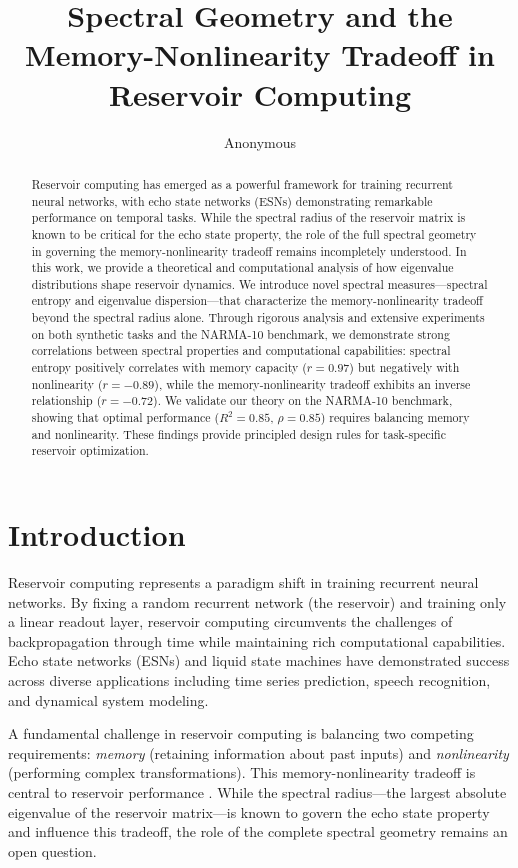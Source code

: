 \documentclass{article}
\title{Spectral Geometry and the Memory-Nonlinearity Tradeoff in Reservoir Computing}
\author{Anonymous}
\begin{document}
\maketitle

\begin{abstract}
Reservoir computing has emerged as a powerful framework for training recurrent neural networks, with echo state networks (ESNs) demonstrating remarkable performance on temporal tasks. While the spectral radius of the reservoir matrix is known to be critical for the echo state property, the role of the full spectral geometry in governing the memory-nonlinearity tradeoff remains incompletely understood. In this work, we provide a theoretical and computational analysis of how eigenvalue distributions shape reservoir dynamics. We introduce novel spectral measures—spectral entropy and eigenvalue dispersion—that characterize the memory-nonlinearity tradeoff beyond the spectral radius alone. Through rigorous analysis and extensive experiments on both synthetic tasks and the NARMA-10 benchmark, we demonstrate strong correlations between spectral properties and computational capabilities: spectral entropy positively correlates with memory capacity ($r=0.97$) but negatively with nonlinearity ($r=-0.89$), while the memory-nonlinearity tradeoff exhibits an inverse relationship ($r=-0.72$). We validate our theory on the NARMA-10 benchmark, showing that optimal performance ($R^2=0.85$, $\rho=0.85$) requires balancing memory and nonlinearity. These findings provide principled design rules for task-specific reservoir optimization.
\end{abstract}

\section{Introduction}

Reservoir computing \citep{jaeger2001,maass2002} represents a paradigm shift in training recurrent neural networks. By fixing a random recurrent network (the reservoir) and training only a linear readout layer, reservoir computing circumvents the challenges of backpropagation through time while maintaining rich computational capabilities. Echo state networks (ESNs) \citep{jaeger2001} and liquid state machines \citep{maass2002} have demonstrated success across diverse applications including time series prediction, speech recognition, and dynamical system modeling.

A fundamental challenge in reservoir computing is balancing two competing requirements: \textit{memory} (retaining information about past inputs) and \textit{nonlinearity} (performing complex transformations). This memory-nonlinearity tradeoff is central to reservoir performance \citep{dambre2012}. While the spectral radius—the largest absolute eigenvalue of the reservoir matrix—is known to govern the echo state property and influence this tradeoff, the role of the complete spectral geometry remains an open question.
\end{document}
